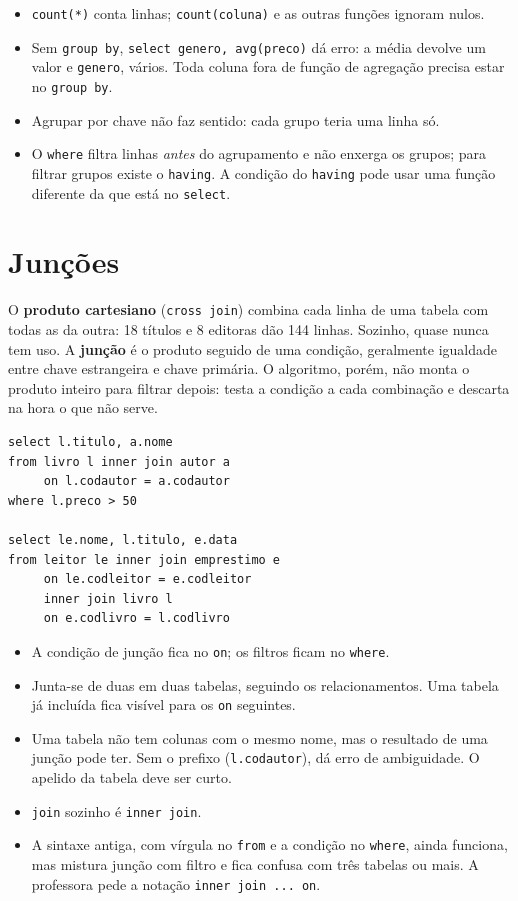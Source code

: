 \begin{itemize}
	\item \texttt{count(*)} conta linhas; \texttt{count(coluna)} e as
	outras funções ignoram nulos.
	\item Sem \texttt{group by}, \texttt{select genero, avg(preco)} dá
	erro: a média devolve um valor e \texttt{genero}, vários. Toda coluna
	fora de função de agregação precisa estar no \texttt{group by}.
	\item Agrupar por chave não faz sentido: cada grupo teria uma linha só.
	\item O \texttt{where} filtra linhas \emph{antes} do agrupamento e não
	enxerga os grupos; para filtrar grupos existe o \texttt{having}. A
	condição do \texttt{having} pode usar uma função diferente da que está
	no \texttt{select}.
\end{itemize}

\section{Junções}

O \textbf{produto cartesiano} (\texttt{cross join}) combina cada linha
de uma tabela com todas as da outra: 18 títulos e 8 editoras dão 144
linhas. Sozinho, quase nunca tem uso. A \textbf{junção}
é o produto seguido de uma condição, geralmente igualdade entre chave
estrangeira e chave primária. O algoritmo, porém, não monta o produto
inteiro para filtrar depois: testa a condição a cada combinação e
descarta na hora o que não serve.

\begin{lstlisting}[caption={Junção interna com duas e três tabelas.}]
select l.titulo, a.nome
from livro l inner join autor a
     on l.codautor = a.codautor
where l.preco > 50

select le.nome, l.titulo, e.data
from leitor le inner join emprestimo e
     on le.codleitor = e.codleitor
     inner join livro l
     on e.codlivro = l.codlivro
\end{lstlisting}

\begin{itemize}
	\item A condição de junção fica no \texttt{on}; os filtros ficam no
	\texttt{where}.
	\item Junta-se de duas em duas tabelas, seguindo os relacionamentos.
	Uma tabela já incluída fica visível para os \texttt{on} seguintes.
	\item Uma tabela não tem colunas com o mesmo nome, mas o resultado de
	uma junção pode ter. Sem o prefixo (\texttt{l.codautor}), dá erro de
	ambiguidade. O apelido da tabela deve ser curto.
	\item \texttt{join} sozinho é \texttt{inner join}.
	\item A sintaxe antiga, com vírgula no \texttt{from} e a condição no
	\texttt{where}, ainda funciona, mas mistura junção com filtro e fica
	confusa com três tabelas ou mais. A professora pede a notação
	\texttt{inner join ... on}.
\end{itemize}

